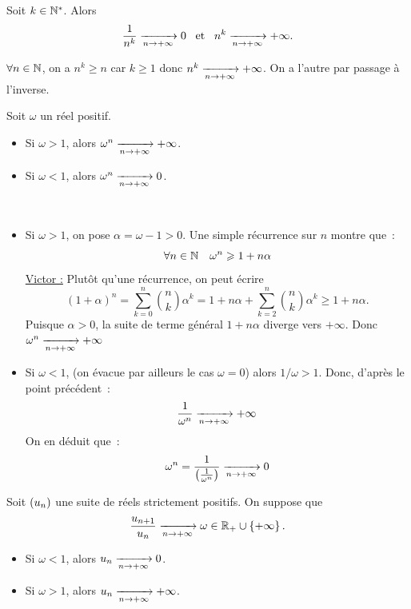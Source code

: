 \documentclass{magnoliaold}
\begin{document}
\begin{proposition}[utile=-3]
Soit $k\in{\mathbb{N}^*}$. Alors
\[\frac{1}{n^k} \xrightarrow[n\rightarrow +\infty]{} 0 \quad\!\text{et}\quad\!
  n^k \xrightarrow[n\rightarrow +\infty]{} +\infty.\]
\end{proposition}

\begin{preuve}
$\forall n\in \mathbb{N}$, on a $n^k\geq n$ car $k\geq 1$ donc $n^k\xrightarrow[n\rightarrow +\infty]{}+\infty$. On a l'autre par passage à l'inverse.
\end{preuve}

\begin{proposition}[utile=-3]
Soit $\omega$ un réel positif.
\begin{itemize}
\item Si $\omega>1$, alors $\omega^n\xrightarrow[n\rightarrow +\infty]{} +\infty$.
\item Si $\omega<1$, alors $\omega^n\xrightarrow[n\rightarrow +\infty]{} 0$.
\end{itemize}
\end{proposition}

\begin{preuve}
$\quad$
\begin{itemize}
\item Si $\omega>1$, on pose $\alpha=\omega-1>0$. Une simple récurrence
  sur $n$ montre que~:
  \[\forall n\in\mathbb{N} \quad  \omega^n \geqslant 1+n\alpha\]
  \underline{Victor :} Plutôt qu'une récurrence, on peut écrire $$(1+\alpha)^n=\sum_{k=0}^n\binom{n}{k}\alpha^k=1+n\alpha+\sum_{k=2}^n\binom{n}{k}\alpha^k \geq 1+n\alpha.$$
  Puisque $\alpha>0$, la suite de terme général $1+n\alpha$ diverge
  vers $+\infty$. Donc $\omega^n \xrightarrow[n\rightarrow +\infty]{} +\infty$
\item Si $\omega<1$, (on évacue par ailleurs le cas $\omega=0$) alors $1/\omega>1$. Donc, d'après le point précédent~:
  \[\frac{1}{\omega^n} \xrightarrow[n\rightarrow +\infty]{} +\infty\]
  On en déduit que~:
  \[\omega^n=\frac{1}{\left(\frac{1}{\omega^n}\right)} \xrightarrow[n\rightarrow +\infty]{} 0\]
\end{itemize}
\end{preuve}


\begin{proposition}[utile=-3]
Soit $\left(u_n\right)$ une suite de réels strictement positifs. On suppose que
\[\frac{u_{n+1}}{u_n}\xrightarrow[n\rightarrow +\infty]{}\omega\in\mathbb{R}_+\cup\left\{+\infty\right\}.\]
\begin{itemize}
\item Si $\omega<1$, alors $u_n\xrightarrow[n\rightarrow +\infty]{} 0$.
\item Si $\omega>1$, alors $u_n\xrightarrow[n\rightarrow +\infty]{} +\infty$.
\end{itemize}
\end{proposition}
\end{document}

